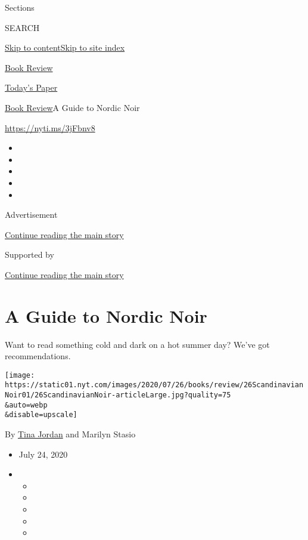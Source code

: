 Sections

SEARCH

\protect\hyperlink{site-content}{Skip to
content}\protect\hyperlink{site-index}{Skip to site index}

\href{https://www.nytimes.com/section/books/review}{Book Review}

\href{https://myaccount.nytimes.com/auth/login?response_type=cookie\&client_id=vi}{}

\href{https://www.nytimes.com/section/todayspaper}{Today's Paper}

\href{/section/books/review}{Book Review}\textbar{}A Guide to Nordic
Noir

\url{https://nyti.ms/3jFbnv8}

\begin{itemize}
\item
\item
\item
\item
\item
\end{itemize}

Advertisement

\protect\hyperlink{after-top}{Continue reading the main story}

Supported by

\protect\hyperlink{after-sponsor}{Continue reading the main story}

\hypertarget{a-guide-to-nordic-noir}{%
\section{A Guide to Nordic Noir}\label{a-guide-to-nordic-noir}}

Want to read something cold and dark on a hot summer day? We've got
recommendations.

\texttt{[image: https://static01.nyt.com/images/2020/07/26/books/review/26ScandinavianNoir01/26ScandinavianNoir-articleLarge.jpg?quality=75\\\&auto=webp\\\&disable=upscale]}

By \href{https://www.nytimes.com/by/tina-jordan}{Tina Jordan} and
Marilyn Stasio

\begin{itemize}
\item
  July 24, 2020
\item
  \begin{itemize}
  \item
  \item
  \item
  \item
  \item
  \end{itemize}
\end{itemize}

